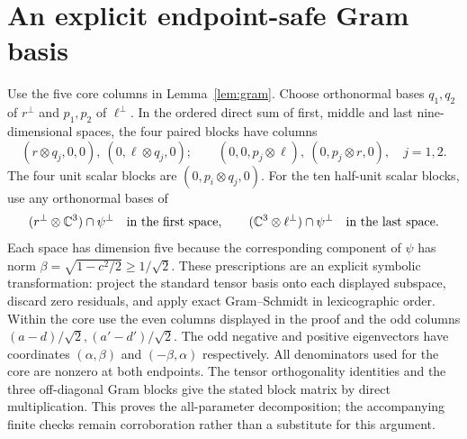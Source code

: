 \documentclass[11pt,a4paper]{article}
\theoremstyle{remark}\newtheorem{remark}[theorem]{Remark}
\newcommand{\C}{\mathbb C}
\begin{document}
\section{An explicit endpoint-safe Gram basis}\label{app:basis}
Use the five core columns in Lemma~\ref{lem:gram}. Choose orthonormal
bases $q_1,q_2$ of $r^\perp$ and $p_1,p_2$ of $\ell^\perp$.
In the ordered direct sum of first, middle and last nine-dimensional spaces,
the four paired blocks have columns
\[
(r\otimes q_j,0,0),\ (0,\ell\otimes q_j,0);\qquad
(0,0,p_j\otimes\ell),\ (0,p_j\otimes r,0),\quad j=1,2.
\]
The four unit scalar blocks are $(0,p_i\otimes q_j,0)$.
For the ten half-unit scalar blocks, use any orthonormal bases of
\[
 (r^\perp\otimes\C^3)\cap\psi^\perp
 \quad\hbox{in the first space},\qquad
 (\C^3\otimes\ell^\perp)\cap\psi^\perp
 \quad\hbox{in the last space}.
\]
Each space has dimension five because the corresponding component of
$\psi$ has norm $\beta=\sqrt{1-c^2/2}\ge1/\sqrt2$.
These prescriptions are an explicit symbolic transformation: project the
standard tensor basis onto each displayed subspace, discard zero residuals,
and apply exact Gram--Schmidt in lexicographic order. Within the core use
the even columns displayed in the proof and the odd columns
$(a-d)/\sqrt2,(a'-d')/\sqrt2$. The odd negative and positive eigenvectors
have coordinates $(\alpha,\beta)$ and $(-\beta,\alpha)$ respectively.
All denominators used for the core are nonzero at both endpoints.
The tensor orthogonality identities and the three off-diagonal Gram blocks
give the stated block matrix by direct multiplication. This proves the
all-parameter decomposition; the accompanying finite checks remain
corroboration rather than a substitute for this argument.
\end{document}
